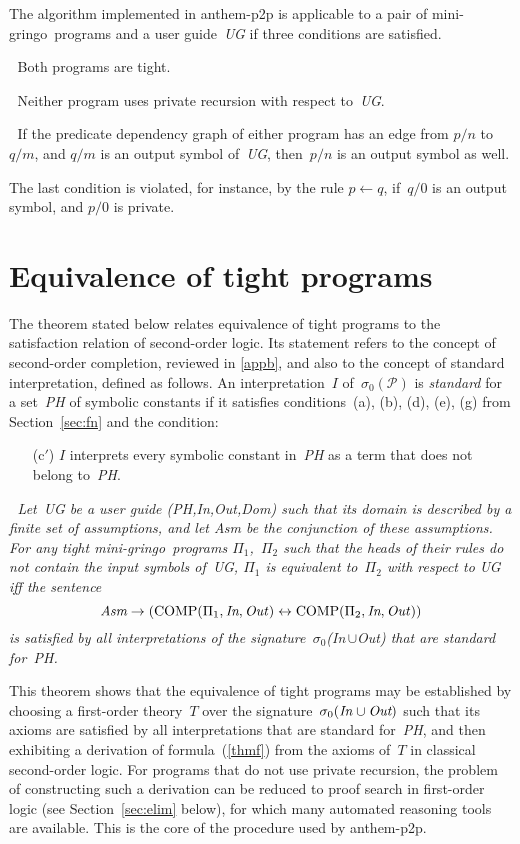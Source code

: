 \documentclass{new_tlp}
\def\ar{\leftarrow}
\def\lrar{\leftrightarrow}
\def\beq{\begin{equation}}
\def\eeq#1{\label{#1}\end{equation}}
\def\gringo{{\sc gringo}}
\newcommand{\PP}{\mathcal{P}}
\begin{document}
The algorithm implemented in {\sc anthem-p2p} is applicable to a pair
of mini-\gringo\ programs and a user guide~\emph{UG} if three
conditions are satisfied.

\medskip{}$\;$ Both programs are tight.

\medskip{}$\;$ Neither program uses private recursion
with respect to~\emph{UG}.

\medskip{}$\;$ If the predicate dependency graph of
either program has an edge from $p/n$ to $q/m$, and $q/m$ is an output symbol
of~\emph{UG}, then~$p/n$ is an output symbol as well.

\medskip
The last condition is violated, for instance, by the rule $p\ar q$,
if~$q/0$ is an output symbol, and $p/0$ is private.

\section{Equivalence of tight programs}\label{sec:tight}

The theorem stated below relates equivalence of tight programs to the
satisfaction relation of second-order logic.  Its statement refers to
the concept of second-order completion, reviewed in \ref{appb},
and also to the concept of  standard interpretation, defined as follows.
An interpretation~$I$ of~$\sigma_0(\PP)$ is \emph{standard} for a
set~\emph{PH} of symbolic constants if it
satisfies conditions~(a), (b), (d), (e), (g)
from Section~\ref{sec:fn} and the condition:
\begin{itemize}
\item[(c$'$)] $I$ interprets every symbolic constant in~\emph{PH}
  as a term that does not belong to~\emph{PH}.
\end{itemize}

\medskip{}$\;$\emph{
  Let~UG be a user guide (PH,In,Out,Dom) such that its domain is described by
  a finite set of assumptions, and let Asm be the conjunction of these
  assumptions.
  For any tight mini-\gringo\ programs $\Pi_1$,~$\Pi_2$ such that the
  heads of their rules do not contain the input symbols of~UG,
$\Pi_1$ is equivalent to~$\Pi_2$ with respect to UG iff the sentence}
\beq
\emph{Asm}\to(\hbox{COMP}(\Pi_1,\emph{In},\emph{Out\/}) \lrar
\hbox{COMP}(\Pi_2,\emph{In},\emph{Out\/}))
\eeq{thmf}
\emph{is satisfied by all interpretations of the
  signature~$\sigma_0$(In\,$\cup$Out) that are standard for~PH.}
\medskip

This theorem shows that the equivalence of tight programs may be established
by choosing a first-order theory~$T$ over the
signature~$\sigma_0(\emph{In\/}\cup\emph{Out})$ such that its axioms are
satisfied by all interpretations that are
standard for~\emph{PH}, and then exhibiting a derivation of
formula~(\ref{thmf}) from the axioms of~$T$ in classical second-order logic.
For programs that do not use private recursion, the problem of constructing
such a derivation can be reduced to proof search in first-order logic
(see Section~\ref{sec:elim}
below), for which many automated reasoning tools are available.
This is the core of the procedure used by {\sc anthem-p2p}.
\end{document}
